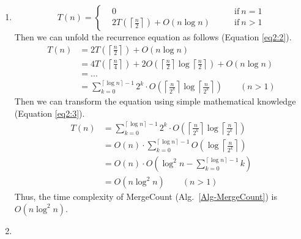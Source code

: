\documentclass[12pt,a4paper]{article}
\makeatletter
\newtheorem*{solution}{Solution}
\theoremstyle{definition}
\renewenvironment{solution}[1][Solution] {\par\pushQED{\qed}\normalfont\topsep6\p@\@plus6\p@\relax\trivlist\item[\hskip\labelsep\bfseries#1\@addpunct{.}]\ignorespaces}{\popQED\endtrivlist\@endpefalse} \makeatother
\makeatother
\begin{document}
\begin{enumerate}
\begin{solution}
\begin{equation}
        T(n) = \left\{
        \begin{aligned}
        & 0 & \quad \quad \mathrm{if\ } n = 1 \\
        & 2T\left(\left\lceil \frac{n}{2} \right\rceil\right) + O(n \log{n}) &  \quad \quad \mathrm{if\ } n > 1
        \end{aligned}
        \right.
        \label{eq2:1}
        \end{equation}
        Then we can unfold the recurrence equation as follows (Equation \eqref{eq2:2}).
        \begin{equation}
        \begin{aligned}
        T(n) &= 2T\left(\left\lceil \frac{n}{2} \right\rceil\right) + O(n \log{n}) \\
             &= 4T\left(\left\lceil \frac{n}{4} \right\rceil\right) + 2 O\left(\left\lceil \frac{n}{2} \right\rceil\log{\left\lceil \frac{n}{2} \right\rceil}\right) + O(n \log{n}) \\
             &= ... \\
             &= \sum_{k=0}^{\left\lceil\log{n}\right\rceil-1} 2^k \cdot O\left(\left\lceil \frac{n}{2^k} \right\rceil \log{\left\lceil \frac{n}{2^k} \right\rceil} \right) \quad \quad (n > 1)
        \end{aligned}
        \label{eq2:2}
        \end{equation}
        Then we can transform the equation using simple mathematical knowledge (Equation \eqref{eq2:3}).
        \begin{equation}
        \begin{aligned}
        T(n) &= \sum_{k=0}^{\left\lceil\log{n}\right\rceil - 1} 2^k \cdot O\left(\left\lceil \frac{n}{2^k} \right\rceil \log{\left\lceil \frac{n}{2^k} \right\rceil} \right) \\
             &= O(n) \cdot \sum_{k=0}^{\left\lceil\log{n}\right\rceil - 1} O\left(\log{\left\lceil \frac{n}{2^k} \right\rceil} \right) \\
             &= O(n) \cdot O\left(\log^2{n} - \sum_{k=0}^{\left\lceil\log{n}\right\rceil - 1}k\right) \\
             &= O(n \log^2{n}) \quad \quad (n > 1)
        \end{aligned}
        \label{eq2:3}
        \end{equation}
        Thus, the time complexity of MergeCount (Alg.~\ref{Alg-MergeCount}) is $O(n \log^2{n})$.
    \end{solution}
    \clearpage
    \item

\end{enumerate}
\end{document}

